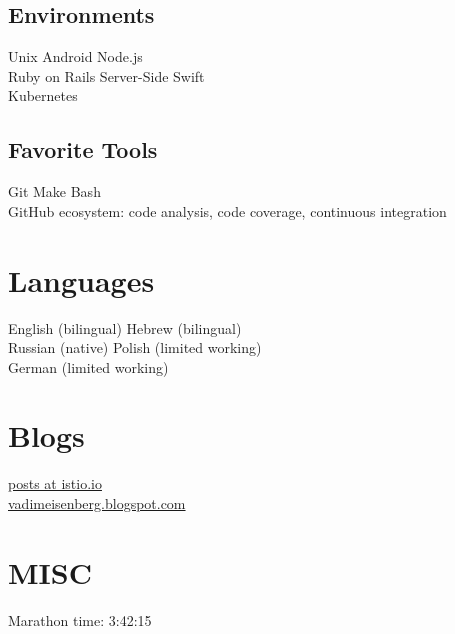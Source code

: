 \documentclass[]{deedy-resume}
\begin{document}
\begin{minipage}[t]{0.33\textwidth}
\subsection{Environments}
Unix \textbullet{}  Android \textbullet{}  Node.js \\
Ruby on Rails \textbullet{} Server-Side Swift \\
Kubernetes
\sectionsep

\subsection{Favorite Tools}
Git \textbullet{}  Make \textbullet{}  Bash \textbullet{} \\
GitHub ecosystem: code analysis, code coverage, continuous integration
\sectionsep

\section{Languages}
\vspace{\topsep} %
English (bilingual) \textbullet{} Hebrew (bilingual) \\
Russian (native)  \textbullet{} Polish (limited working) \\
German (limited working)
\sectionsep

\sectionsep

\section{Blogs}
\href{https://istio.io/search.html?q=vadim\%20eisenberg}{posts at istio.io} \\
\href{http://vadimeisenberg.blogspot.com}{vadimeisenberg.blogspot.com}
\sectionsep

\sectionsep

\section{MISC}
Marathon time: 3:42:15

%
%

\end{minipage}
\end{document}
